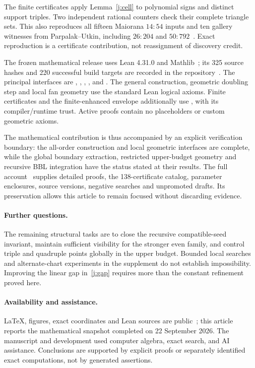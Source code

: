 The finite certificates apply Lemma~\ref{j:cell} to polynomial signs and distinct support triples. Two independent rational counters check their complete triangle sets. This also reproduces all fifteen Maiorana $14:54$ inputs and ten gallery witnesses from Parpalak--Utkin, including $26:204$ and $50:792$~\cite{maiorana2026,parpalakutkinGallery2026}. Exact reproduction is a certificate contribution, not reassignment of discovery credit.

The frozen mathematical release uses Lean 4.31.0 and Mathlib~\cite{lean4,mathlib}; its 325 source hashes and 220 successful build targets are recorded in the repository~\cite{zarzueloRepository}. The principal interfaces are , , , , and . The general construction, geometric doubling step and local fan geometry use the standard Lean logical axioms. Finite certificates and the finite-enhanced envelope additionally use , with its compiler/runtime trust. Active proofs contain no placeholders or custom geometric axioms.

The mathematical contribution is thus accompanied by an explicit verification boundary: the all-order construction and local geometric interfaces are complete, while the global boundary extraction, restricted upper-budget geometry and recursive BBL integration have the status stated at their results. The full account~\cite{zarzueloFull2026} supplies detailed proofs, the 138-certificate catalog, parameter enclosures, source versions, negative searches and unpromoted drafts. Its preservation allows this article to remain focused without discarding evidence.

\paragraph{Further questions.}
The remaining structural tasks are to close the recursive compatible-seed invariant, maintain sufficient visibility for the stronger even family, and control triple and quadruple points globally in the upper budget. Bounded local searches and alternate-chart experiments in the supplement do not establish impossibility. Improving the linear gap in~\eqref{j:gap} requires more than the constant refinement proved here.

\paragraph{Availability and assistance.}
LaTeX, figures, exact coordinates and Lean sources are public~\cite{zarzueloRepository}; this article reports the mathematical snapshot completed on 22 September 2026. The manuscript and development used computer algebra, exact search, and AI assistance. Conclusions are supported by explicit proofs or separately identified exact computations, not by generated assertions.
